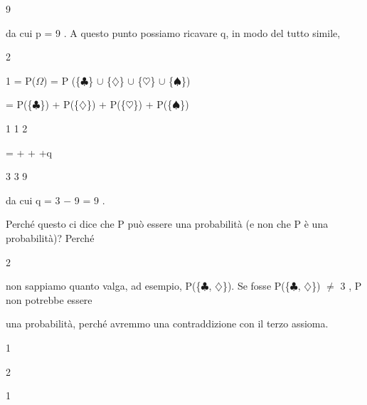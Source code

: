 \documentclass[a4paper,portrait,12pt]{article}
\begin{document}
9


\begin{flushleft}
da cui p = 9 . A questo punto possiamo ricavare q, in modo del tutto simile,
\end{flushleft}


2





\begin{flushleft}
1 = P($\Omega$) = P (\{$\clubsuit$\} $\cup$ \{$\diamondsuit$\} $\cup$ \{$\heartsuit$\} $\cup$ \{$\spadesuit$\})
\end{flushleft}


\begin{flushleft}
= P(\{$\clubsuit$\}) + P(\{$\diamondsuit$\}) + P(\{$\heartsuit$\}) + P(\{$\spadesuit$\})
\end{flushleft}


1 1 2


\begin{flushleft}
= + + +q
\end{flushleft}


3 3 9


\begin{flushleft}
da cui q = 3 $-$ 9 = 9 .
\end{flushleft}


\begin{flushleft}
Perch\'{e} questo ci dice che P pu\`{o} essere una probabilit\`{a} (e non che P \`{e} una probabilit\`{a})? Perch\'{e}
\end{flushleft}


2


\begin{flushleft}
non sappiamo quanto valga, ad esempio, P(\{$\clubsuit$, $\diamondsuit$\}). Se fosse P(\{$\clubsuit$, $\diamondsuit$\}) $\neq$ 3 , P non potrebbe essere
\end{flushleft}


\begin{flushleft}
una probabilit\`{a}, perch\'{e} avremmo una contraddizione con il terzo assioma.
\end{flushleft}


1





2





1
\end{document}
